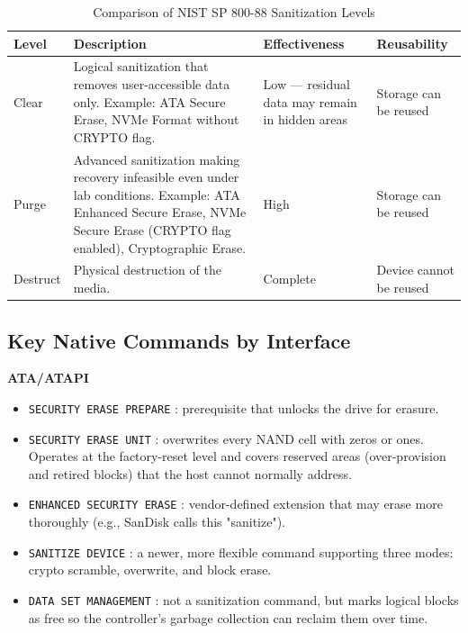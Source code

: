 \begin{table}[H]
    \centering
    \caption{Comparison of NIST SP 800-88 Sanitization Levels}
    \label{tab:sanitization-levels}
    \begin{tabularx}{\textwidth}{lXXl}
        \toprule
        \textbf{Level} & \textbf{Description} & \textbf{Effectiveness} & \textbf{Reusability} \\
        \midrule
        Clear & Logical sanitization that removes user-accessible data only. Example: ATA Secure Erase, NVMe Format without CRYPTO flag. & Low — residual data may remain in hidden areas & Storage can be reused \\
        \midrule
        Purge & Advanced sanitization making recovery infeasible even under lab conditions. Example: ATA Enhanced Secure Erase, NVMe Secure Erase (CRYPTO flag enabled), Cryptographic Erase. & High & Storage can be reused \\
        \midrule
        Destruct & Physical destruction of the media. & Complete & Device cannot be reused \\
        \bottomrule
    \end{tabularx}
\end{table}

\subsection{Key Native Commands by Interface}

\textbf{ATA/ATAPI} 
\begin{itemize}
    \item \texttt{SECURITY ERASE PREPARE} : prerequisite that unlocks the drive for erasure.
    \item \texttt{SECURITY ERASE UNIT} : overwrites every NAND cell with zeros or ones. Operates at the factory-reset level and covers reserved areas (over-provision and retired blocks) that the host cannot normally address.
    \item \texttt{ENHANCED SECURITY ERASE} : vendor-defined extension that may erase more thoroughly (e.g., SanDisk calls this "sanitize").
    \item \texttt{SANITIZE DEVICE} : a newer, more flexible command supporting three modes: crypto scramble, overwrite, and block erase.
    \item \texttt{DATA SET MANAGEMENT} : not a sanitization command, but marks logical blocks as free so the controller's garbage collection can reclaim them over time.
\end{itemize}

